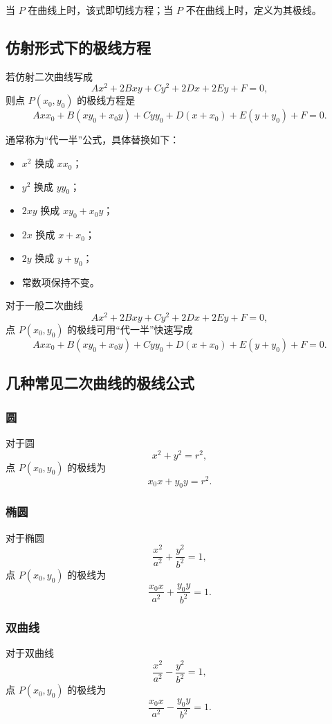 当 $P$ 在曲线上时，该式即切线方程；当 $P$ 不在曲线上时，定义为其极线。

\subsection{仿射形式下的极线方程}
若仿射二次曲线写成
\[
Ax^2+2Bxy+Cy^2+2Dx+2Ey+F=0,
\]
则点 $P(x_0,y_0)$ 的极线方程是
\[
Axx_0+B(xy_0+x_0y)+Cyy_0+D(x+x_0)+E(y+y_0)+F=0.
\]

通常称为“代一半”公式，具体替换如下：

\begin{itemize}
    \item $x^2$ 换成 $xx_0$；
    \item $y^2$ 换成 $yy_0$；
    \item $2xy$ 换成 $xy_0+x_0y$；
    \item $2x$ 换成 $x+x_0$；
    \item $2y$ 换成 $y+y_0$；
    \item 常数项保持不变。
\end{itemize}

\begin{criterion}
对于一般二次曲线
\[
Ax^2+2Bxy+Cy^2+2Dx+2Ey+F=0,
\]
点 $P(x_0,y_0)$ 的极线可用“代一半”快速写成
\[
Axx_0+B(xy_0+x_0y)+Cyy_0+D(x+x_0)+E(y+y_0)+F=0.
\]
\end{criterion}

\subsection{几种常见二次曲线的极线公式}
\subsubsection{圆}
对于圆
\[
x^2+y^2=r^2,
\]
点 $P(x_0,y_0)$ 的极线为
\[
x_0x+y_0y=r^2.
\]

\subsubsection{椭圆}
对于椭圆
\[
\frac{x^2}{a^2}+\frac{y^2}{b^2}=1,
\]
点 $P(x_0,y_0)$ 的极线为
\[
\frac{x_0x}{a^2}+\frac{y_0y}{b^2}=1.
\]

\subsubsection{双曲线}
对于双曲线
\[
\frac{x^2}{a^2}-\frac{y^2}{b^2}=1,
\]
点 $P(x_0,y_0)$ 的极线为
\[
\frac{x_0x}{a^2}-\frac{y_0y}{b^2}=1.
\]

